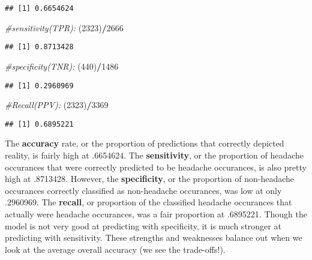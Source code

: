 \documentclass[]{article}
\newenvironment{Shaded}{\begin{snugshade}}{\end{snugshade}}
\newcommand{\CommentTok}[1]{\textcolor[rgb]{0.56,0.35,0.01}{\textit{#1}}}
\newcommand{\DecValTok}[1]{\textcolor[rgb]{0.00,0.00,0.81}{#1}}
\newcommand{\NormalTok}[1]{#1}
\newcommand{\OperatorTok}[1]{\textcolor[rgb]{0.81,0.36,0.00}{\textbf{#1}}}
\begin{document}
\begin{verbatim}
## [1] 0.6654624
\end{verbatim}

\begin{Shaded}
\begin{Highlighting}[]
\CommentTok{#sensitivity(TPR):}
\NormalTok{(}\DecValTok{2323}\NormalTok{)}\OperatorTok{/}\DecValTok{2666}
\end{Highlighting}
\end{Shaded}

\begin{verbatim}
## [1] 0.8713428
\end{verbatim}

\begin{Shaded}
\begin{Highlighting}[]
\CommentTok{#specificity(TNR):}
\NormalTok{(}\DecValTok{440}\NormalTok{)}\OperatorTok{/}\DecValTok{1486}
\end{Highlighting}
\end{Shaded}

\begin{verbatim}
## [1] 0.2960969
\end{verbatim}

\begin{Shaded}
\begin{Highlighting}[]
\CommentTok{#Recall(PPV):}
\NormalTok{(}\DecValTok{2323}\NormalTok{)}\OperatorTok{/}\DecValTok{3369}
\end{Highlighting}
\end{Shaded}

\begin{verbatim}
## [1] 0.6895221
\end{verbatim}

The \textbf{accuracy} rate, or the proportion of predictions that
correctly depicted reality, is fairly high at .6654624. The
\textbf{sensitivity}, or the proportion of headache occurances that were
correctly predicted to be headache occurances, is also pretty high at
.8713428. However, the \textbf{specificity}, or the proportion of
non-headache occurances correctly classified as non-headache occurances,
was low at only .2960969. The \textbf{recall}, or proportion of the
classified headache occurances that actually were headache occurances,
was a fair proportion at .6895221. Though the model is not very good at
predicting with specificity, it is much stronger at predicting with
sensitivity. These strengths and weaknesses balance out when we look at
the average overall accuracy (we see the trade-offs!).
\end{document}
